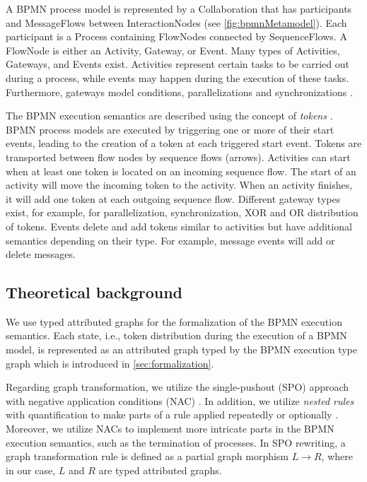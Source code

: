 \documentclass[submission, copyright, creativecommons]{eptcs}
\begin{document}
A BPMN process model is represented by a \textsf{Collaboration} that has \textsf{participants} and \textsf{MessageFlows} between \textsf{InteractionNodes} (see  \cref{fig:bpmnMetamodel}).
Each participant is a \textsf{Process} containing \textsf{FlowNodes} connected by \textsf{SequenceFlows}.
A \textsf{FlowNode} is either an \textsf{Activity}, \textsf{Gateway}, or \textsf{Event}.
Many types of \textsf{Activities}, \textsf{Gateways}, and \textsf{Events} exist.
Activities represent certain tasks to be carried out during a process, while events may happen during the execution of these tasks.
Furthermore, gateways model conditions, parallelizations and synchronizations \cite{freundRealLifeBPMNUsing2019}.

The BPMN execution semantics are described using the concept of \emph{tokens} \cite{objectmanagementgroupBusinessProcessModel2013}.
BPMN process models are executed by triggering one or more of their start events, leading to the creation of a token at each triggered start event.
Tokens are transported between flow nodes by sequence flows (arrows).
Activities can start when at least one token is located on an incoming sequence flow.
The start of an activity will move the incoming token to the activity.
When an activity finishes, it will add one token at each outgoing sequence flow.
Different gateway types exist, for example, for parallelization, synchronization, XOR and OR distribution of tokens.
Events delete and add tokens similar to activities but have additional semantics depending on their type.
For example, message events will add or delete messages.

\subsection{Theoretical background}
We use typed attributed graphs for the formalization of the BPMN execution semantics.
Each state, i.e., token distribution during the execution of a BPMN model, is represented as an attributed graph typed by the BPMN execution type graph which is introduced in \cref{sec:formalization}.

Regarding graph transformation, we utilize the single-pushout (SPO) approach with negative application conditions (NAC) \cite{ehrigALGEBRAICAPPROACHESGRAPH1997}.
In addition, we utilize \emph{nested rules} with quantification to make parts of a rule applied repeatedly or optionally \cite{rensinkNestedQuantificationGraph2006,rensinkHowMuchAre2017}.
Moreover, we utilize NACs to implement more intricate parts in the BPMN execution semantics, such as the termination of processes. 
In SPO rewriting, a graph transformation rule is defined as a partial graph morphism $L \to R$, where in our case, $L$ and $R$ are typed attributed graphs. 
\end{document}
